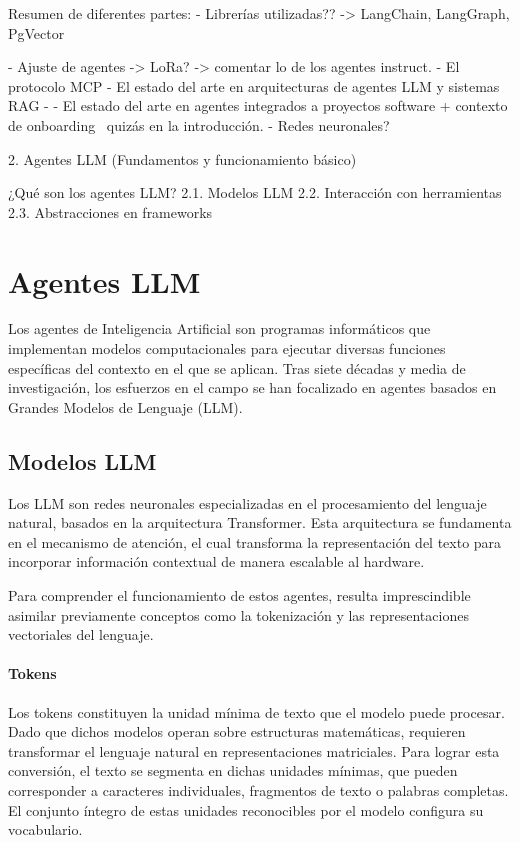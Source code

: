 Resumen de diferentes partes: 
- Librerías utilizadas?? -> LangChain, LangGraph, PgVector

- Ajuste de agentes -> LoRa? -> comentar lo de los agentes instruct.
- El protocolo MCP
- El estado del arte en arquitecturas de agentes LLM y sistemas RAG
- 
- El estado del arte en agentes integrados a proyectos software + contexto de onboarding ~quizás en la introducción.
- Redes neuronales?

2. Agentes LLM (Fundamentos y funcionamiento básico)

¿Qué son los agentes LLM?
2.1. Modelos LLM
2.2. Interacción con herramientas
2.3. Abstracciones en frameworks


\section{Agentes LLM}

Los agentes de Inteligencia Artificial son programas informáticos que implementan modelos computacionales para ejecutar diversas funciones específicas del contexto en el que se aplican. Tras siete décadas y media de investigación, los esfuerzos en el campo se han focalizado en agentes basados en Grandes Modelos de Lenguaje (LLM). 

\subsection{Modelos LLM}

Los LLM son redes neuronales especializadas en el procesamiento del lenguaje natural, basados en la arquitectura Transformer. Esta arquitectura se fundamenta en el mecanismo de atención, el cual transforma la representación del texto para incorporar información contextual de manera escalable al hardware. 

Para comprender el funcionamiento de estos agentes, resulta imprescindible asimilar previamente conceptos como la tokenización y las representaciones vectoriales del lenguaje.

\paragraph{Tokens}
Los tokens constituyen la unidad mínima de texto que el modelo puede procesar. Dado que dichos modelos operan sobre estructuras matemáticas, requieren transformar el lenguaje natural en representaciones matriciales. Para lograr esta conversión, el texto se segmenta en dichas unidades mínimas, que pueden corresponder a caracteres individuales, fragmentos de texto o palabras completas. El conjunto íntegro de estas unidades reconocibles por el modelo configura su vocabulario. 

